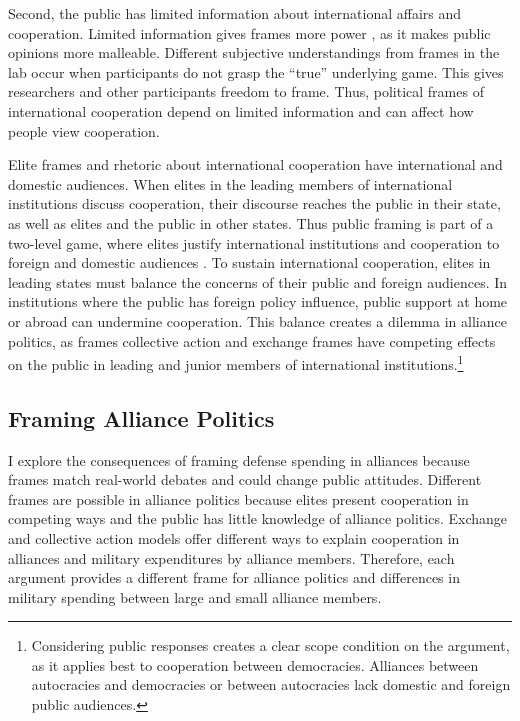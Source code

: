 \documentclass[12pt]{article}
\begin{document}
Second, the public has limited information about international affairs and cooperation.
Limited information gives frames more power \citep{Druckman2001}, as it makes public opinions more malleable. 
Different subjective understandings from frames in the lab occur when participants do not grasp the ``true'' underlying game. 
This gives researchers and other participants freedom to frame.
Thus, political frames of international cooperation depend on limited information and can affect how people view cooperation.  


Elite frames and rhetoric about international cooperation have international and domestic audiences. 
When elites in the leading members of international institutions discuss cooperation, their discourse reaches the public in their state, as well as elites and the public in other states. 
Thus public framing is part of a two-level game, where elites justify international institutions and cooperation to foreign and domestic audiences \citep{Putnam1988}.
To sustain international cooperation, elites in leading states must balance the concerns of their public and foreign audiences. 
In institutions where the public has foreign policy influence, public support at home or abroad can undermine cooperation. 
This balance creates a dilemma in alliance politics, as frames collective action and exchange frames have competing effects on the public in leading and junior members of international institutions.\footnote{Considering public responses creates a clear scope condition on the argument, as it applies best to cooperation between democracies. Alliances between autocracies and democracies or between autocracies lack domestic and foreign public audiences.}


\subsection{Framing Alliance Politics}


I explore the consequences of framing defense spending in alliances because frames match real-world debates and could change public attitudes.  
Different frames are possible in alliance politics because elites present cooperation in competing ways and the public has little knowledge of alliance politics. 
Exchange and collective action models offer different ways to explain cooperation in alliances and military expenditures by alliance members.
Therefore, each argument provides a different frame for alliance politics and differences in military spending between large and small alliance members. 
\end{document}
